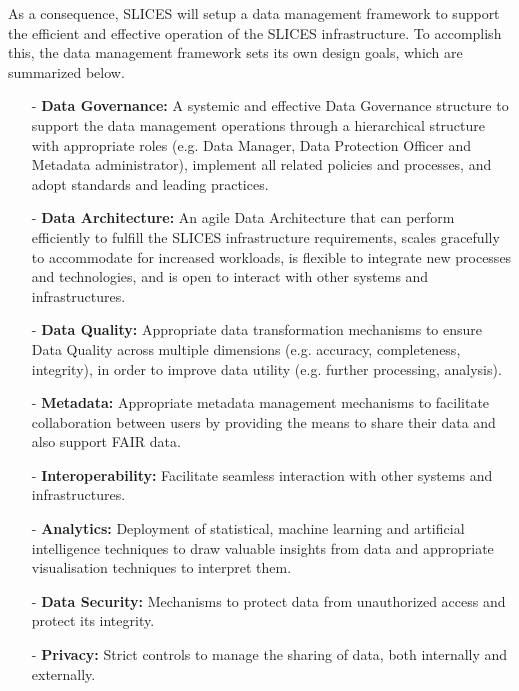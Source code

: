 As a consequence, SLICES will setup a data management framework to support the efficient and effective operation of the SLICES infrastructure. To accomplish this, the data management framework sets its own design goals, which are summarized below.

\begin{itemize}
    \item[-] \textbf{Data Governance: } A systemic and effective Data Governance structure to support the data management operations through a hierarchical structure with appropriate roles (e.g. Data Manager, Data Protection Officer and Metadata administrator), implement all related policies and processes, and adopt standards and leading practices.
    \item[-] \textbf{Data Architecture: } An agile Data Architecture that can perform efficiently to fulfill the SLICES infrastructure requirements, scales gracefully to accommodate for increased workloads, is flexible to integrate new processes and technologies, and is open to interact with other systems and infrastructures. 
    \item[-] \textbf{Data Quality:} Appropriate data transformation mechanisms to ensure Data Quality across multiple dimensions (e.g. accuracy, completeness, integrity), in order to improve data utility (e.g. further processing, analysis).
    \item[-] \textbf{Metadata:} Appropriate metadata management mechanisms to facilitate collaboration between users by providing the means to share their data and also support FAIR data.  
    \item[-] \textbf{Interoperability:  } Facilitate seamless interaction with other systems and infrastructures.
    \item[-] \textbf{Analytics:} Deployment of statistical, machine learning and artificial intelligence techniques to draw valuable insights from data and appropriate visualisation techniques to interpret them.
    \item[-] \textbf{Data Security:  } Mechanisms to protect data from unauthorized access and protect its integrity.
    \item[-] \textbf{Privacy: } Strict controls to manage the sharing of data, both internally and externally.
    
\end{itemize} 





